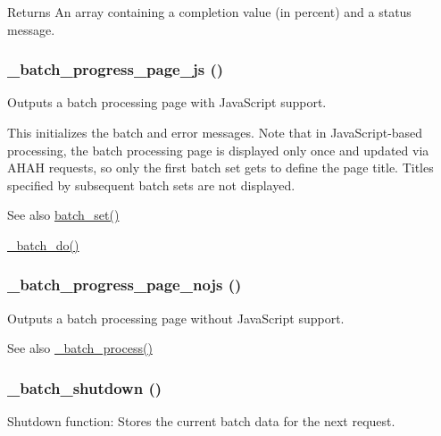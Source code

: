 \begin{DoxyReturn}{Returns}
An array containing a completion value (in percent) and a status message. 
\end{DoxyReturn}
\hypertarget{batch_8inc_ac8152d29181479967c4bdc7e0caf920e}{
\subsubsection[{\_\-batch\_\-progress\_\-page\_\-js}]{\setlength{\rightskip}{0pt plus 5cm}\_\-batch\_\-progress\_\-page\_\-js ()}}
\label{batch_8inc_ac8152d29181479967c4bdc7e0caf920e}
Outputs a batch processing page with JavaScript support.

This initializes the batch and error messages. Note that in JavaScript-\/based processing, the batch processing page is displayed only once and updated via AHAH requests, so only the first batch set gets to define the page title. Titles specified by subsequent batch sets are not displayed.

\begin{DoxySeeAlso}{See also}
\hyperlink{group__batch_ga9ff3f18b3bdd1d62ab7ac681a22a7170}{batch\_\-set()} 

\hyperlink{batch_8inc_a200def74deec79748ee5accf5117db6d}{\_\-batch\_\-do()} 
\end{DoxySeeAlso}
\hypertarget{batch_8inc_ab233b667c1237a8e177e1e6aa1b890ba}{
\subsubsection[{\_\-batch\_\-progress\_\-page\_\-nojs}]{\setlength{\rightskip}{0pt plus 5cm}\_\-batch\_\-progress\_\-page\_\-nojs ()}}
\label{batch_8inc_ab233b667c1237a8e177e1e6aa1b890ba}
Outputs a batch processing page without JavaScript support.

\begin{DoxySeeAlso}{See also}
\hyperlink{batch_8inc_af411ff0cae660684809c5f6a8dbc0353}{\_\-batch\_\-process()} 
\end{DoxySeeAlso}
\hypertarget{batch_8inc_a85d830f44fb762da6e9fdb838180c85f}{
\subsubsection[{\_\-batch\_\-shutdown}]{\setlength{\rightskip}{0pt plus 5cm}\_\-batch\_\-shutdown ()}}
\label{batch_8inc_a85d830f44fb762da6e9fdb838180c85f}
Shutdown function: Stores the current batch data for the next request.

